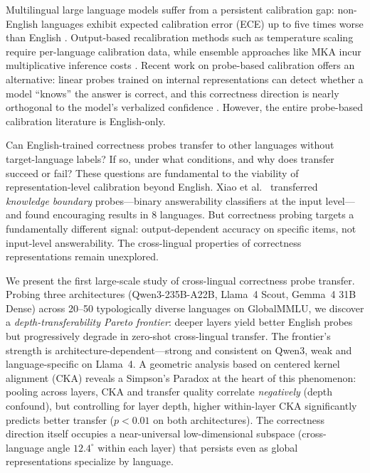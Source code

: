 \documentclass[11pt,a4paper]{article}
\begin{document}
Multilingual large language models suffer from a persistent calibration gap: non-English languages exhibit expected calibration error (ECE) up to five times worse than English \cite{joshi2024llm}. Output-based recalibration methods such as temperature scaling require per-language calibration data, while ensemble approaches like MKA incur multiplicative inference costs \cite{zhou2024lace}. Recent work on probe-based calibration offers an alternative: linear probes trained on internal representations can detect whether a model ``knows'' the answer is correct, and this correctness direction is nearly orthogonal to the model's verbalized confidence \cite{miao2026coral,miao2026steering}. However, the entire probe-based calibration literature is English-only.

Can English-trained correctness probes transfer to other languages without target-language labels? If so, under what conditions, and why does transfer succeed or fail? These questions are fundamental to the viability of representation-level calibration beyond English. Xiao et al.\ \cite{xiao2025crosslingual} transferred \emph{knowledge boundary} probes---binary answerability classifiers at the input level---and found encouraging results in 8 languages. But correctness probing targets a fundamentally different signal: output-dependent accuracy on specific items, not input-level answerability. The cross-lingual properties of correctness representations remain unexplored.

We present the first large-scale study of cross-lingual correctness probe transfer. Probing three architectures (Qwen3-235B-A22B, Llama~4 Scout, Gemma~4 31B Dense) across 20--50 typologically diverse languages on GlobalMMLU, we discover a \emph{depth-transferability Pareto frontier}: deeper layers yield better English probes but progressively degrade in zero-shot cross-lingual transfer. The frontier's strength is architecture-dependent---strong and consistent on Qwen3, weak and language-specific on Llama~4. A geometric analysis based on centered kernel alignment (CKA) reveals a Simpson's Paradox at the heart of this phenomenon: pooling across layers, CKA and transfer quality correlate \emph{negatively} (depth confound), but controlling for layer depth, higher within-layer CKA significantly predicts better transfer ($p < 0.01$ on both architectures). The correctness direction itself occupies a near-universal low-dimensional subspace (cross-language angle $12.4^{\circ}$ within each layer) that persists even as global representations specialize by language.
\end{document}

